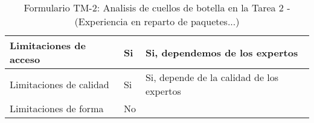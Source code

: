 \begin{table}[H]
{\begin{tabular}{|l|l|l|}
		Limitaciones de acceso& \multicolumn{1}{p{1.0cm}|}{Si} & \multicolumn{1}{p{13.0cm}|}{Si, dependemos de los expertos}\\
		\hline

		Limitaciones de calidad& \multicolumn{1}{p{1.0cm}|}{Si} & \multicolumn{1}{p{13.0cm}|}{Si, depende de la calidad de los expertos}\\
		\hline

		Limitaciones de forma& \multicolumn{1}{p{1.0cm}|}{No} & \multicolumn{1}{p{13.0cm}|}{}\\
		\hline

	  \end{tabular}
	}
	\caption{\label{tab:TM2}Formulario TM-2: Analisis de cuellos de botella en la Tarea 2 - (Experiencia en reparto de paquetes...)}
  \end{table}



